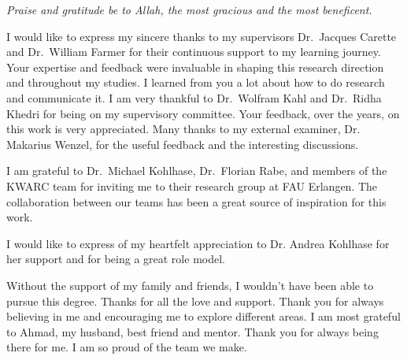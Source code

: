 \vspace{-1cm}
\begin{center} 
\textit{Praise and gratitude be to Allah, the most gracious and the most beneficent.}
\end{center}
\noindent I would like to express my sincere thanks to my supervisors Dr.~Jacques Carette and Dr.~William Farmer for their continuous support to my learning journey.  Your expertise and feedback were invaluable in shaping this research direction and throughout my studies. 
I learned from you a lot about how to do research and communicate it. 
I am very thankful to Dr.~Wolfram Kahl and Dr.~Ridha Khedri for being on my supervisory committee. Your feedback, over the years, on this work is very appreciated. Many thanks to my external examiner, Dr. Makarius Wenzel, for the useful feedback and the interesting discussions. 

I am grateful to Dr.~Michael Kohlhase, Dr.~Florian Rabe, and members of the KWARC team for inviting me to their research group at FAU Erlangen. The collaboration between our teams has been a great source of inspiration for this work. 

I would like to express of my heartfelt appreciation to Dr. Andrea Kohlhase for her support and for being a great role model. 

Without the support of my family and friends, I wouldn't have been able to pursue this degree. Thanks for all the love and support. Thank you for always believing in me and encouraging me to explore different areas. 
I am most grateful to Ahmad, my husband, best friend and mentor. Thank you for always being there for me. I am so proud of the team we make. 

